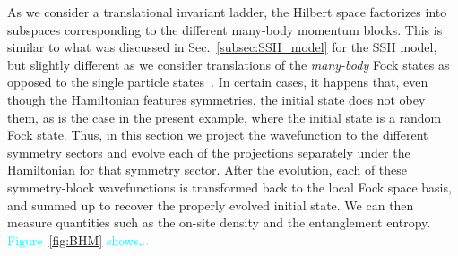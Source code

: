 \documentclass{SciPost}
\newcommand\0{\scalebox{-1}[1]{0}}
\newcommand*{\cyan}{\textcolor{cyan}}
\begin{document}
As we consider a translational invariant ladder, the Hilbert space factorizes into subspaces corresponding to the different many-body momentum blocks. This is similar to what was discussed in Sec.~\ref{subsec:SSH_model} for the SSH model, but slightly different as we consider translations of the \emph{many-body} Fock states as opposed to the single particle states~\cite{anders10}. In certain cases, it happens that, even though the Hamiltonian features symmetries, the initial state does not obey them, as is the case in the present example, where the initial state is a random Fock state. Thus, in this section we project the wavefunction to the different symmetry sectors and evolve each of the projections separately under the Hamiltonian for that symmetry sector. After the evolution, each of these symmetry-block wavefunctions is transformed back to the local Fock space basis, and summed up to recover the properly evolved initial state. We can then measure quantities such as the on-site density and the entanglement entropy. \cyan{Figure~\ref{fig:BHM} shows...}
\end{document}
